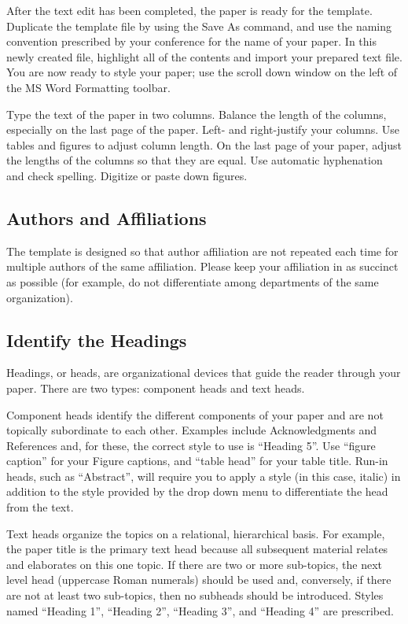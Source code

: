 \documentclass [a4paper,final,conference,10pt]{IDAACS}
\begin{document}
After the text edit has been completed, the paper is ready for the 
template. Duplicate the template file by using the Save As command, and use 
the naming convention prescribed by your conference for the name of your 
paper. In this newly created file, highlight all of the contents 
and import your prepared text file. You are now ready to style your paper; 
use the scroll down window on the left of the MS Word Formatting toolbar.

Type the text of the paper in two columns. Balance the length of 
the columns, especially on the last page of the paper. Left- and 
right-justify your columns. Use tables and figures to adjust column length. 
On the last page of your paper, adjust the lengths of the columns 
so that they are equal. Use automatic hyphenation and check spelling. 
Digitize or paste down figures.

\subsection{Authors and Affiliations}

The template is designed so that author affiliation are not repeated each time
for multiple authors of the same affiliation. Please keep your affiliation in
as succinct as possible (for example, do not differentiate among departments
of the same organization).

\subsection{Identify the Headings}

Headings, or heads, are organizational devices that guide the reader through 
your paper. There are two types: component heads and text heads.

Component heads identify the different components of your paper and are not 
topically subordinate to each other. Examples include Acknowledgments and 
References and, for these, the correct style to use is ``Heading 5''. Use 
``figure caption'' for your Figure captions, and ``table head'' for your 
table title. Run-in heads, such as ``Abstract'', will require you to apply a 
style (in this case, italic) in addition to the style provided by the drop 
down menu to differentiate the head from the text.

Text heads organize the topics on a relational, hierarchical basis. For 
example, the paper title is the primary text head because all subsequent 
material relates and elaborates on this one topic. If there are two or 
more sub-topics, the next level head (uppercase Roman numerals) should be 
used and, conversely, if there are not at least two sub-topics, then no 
subheads should be introduced. Styles named ``Heading 1'', ``Heading 2'',
``Heading 3'', and ``Heading 4'' are prescribed.
\end{document}
